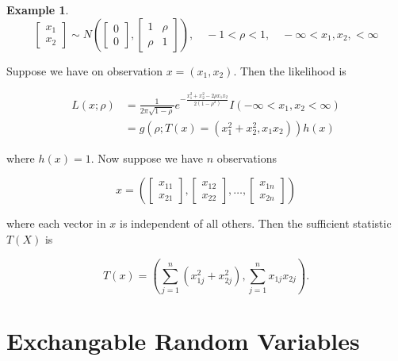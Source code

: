 \documentclass[12pt]{article}
\theoremstyle{definition}
\newtheorem*{example}{Example}
\begin{document}
\begin{example}

\begin{equation*}
\begin{bmatrix}
x_1 \\
x_2
\end{bmatrix} \sim
N \left(
\begin{bmatrix}
0 \\
0
\end{bmatrix}
,
\begin{bmatrix}
1 & \rho \\
\rho & 1
\end{bmatrix}
\right),
\quad
-1 < \rho < 1,
\quad
-\infty < x_1, x_2, < \infty
\end{equation*}

Suppose we have on observation $x = (x_1, x_2)$. Then 
the likelihood is

\begin{align*}
L(x ; \rho) &= \frac{1}{2 \pi \sqrt{1 - \rho}} e^{-\frac{x_1^2 + x_2^2 - 2\rho x_1 x_2}{2(1 - \rho^2)}}
I(-\infty < x_1, x_2 < \infty) \\
&=g(\rho; T(x) = (x_1^2 + x^2_2, x_1 x_2)) h(x)
\end{align*}

where $h(x) = 1$. Now suppose we have $n$ observations

\begin{equation*}
x =
\left(
\begin{bmatrix}
x_{11} \\
x_{21}
\end{bmatrix},
\begin{bmatrix}
x_{12} \\
x_{22}
\end{bmatrix},
\ldots,
\begin{bmatrix}
x_{1n} \\
x_{2n}
\end{bmatrix}
\right)
\end{equation*}

where each vector in $x$ is independent of all others. Then the sufficient
statistic $T(X)$ is

\begin{equation*}
T(x) = \left( \sum_{j=1}^n (x_{1j}^2 + x_{2j}^2 ), \sum_{j = 1}^n x_{1j}x_{2j} \right).
\end{equation*}
\end{example}

\section{Exchangable Random Variables}
\end{document}
